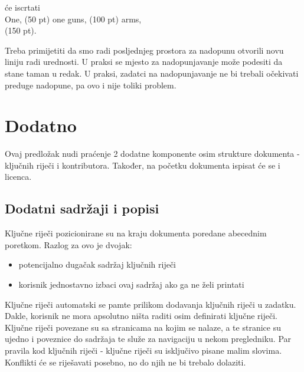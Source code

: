 \documentclass{studosi-workbook}
\begin{document}
	će iscrtati \\
	
	One, \nadopuna(50 pt) one guns, \nadopuna(100 pt) arms, \\
	\nadopuna(150 pt).
	\vspace*{20pt}
	
	Treba primijetiti da smo radi posljednjeg prostora za nadopunu otvorili novu liniju radi urednosti. U praksi se mjesto za nadopunjavanje može podesiti da stane taman u redak. U praksi, zadatci na nadopunjavanje ne bi trebali očekivati preduge nadopune, pa ovo i nije toliki problem.
	
	
	
	\chapter{Dodatno}
	Ovaj predložak nudi praćenje 2 dodatne komponente osim strukture dokumenta - ključnih riječi i kontributora. Također, na početku dokumenta ispisat će se i licenca.
	
	
	\section{Dodatni sadržaji i popisi}
	Ključne riječi pozicionirane su na kraju dokumenta poredane abecednim poretkom. Razlog za ovo je dvojak:
	
	\begin{itemize}
		\item potencijalno dugačak sadržaj ključnih riječi
		\item korisnik jednostavno izbaci ovaj sadržaj ako ga ne želi printati
	\end{itemize}

	Ključne riječi automatski se pamte prilikom dodavanja ključnih riječi u zadatku. Dakle, korisnik ne mora apsolutno ništa raditi osim definirati ključne riječi. Ključne riječi povezane su sa stranicama na kojim se nalaze, a te stranice su ujedno i poveznice do sadržaja te služe za navigaciju u nekom pregledniku. Par pravila kod ključnih riječi - ključne riječi su isključivo pisane malim slovima. Konflikti će se riješavati posebno, no do njih ne bi trebalo dolaziti. \\
\end{document}
